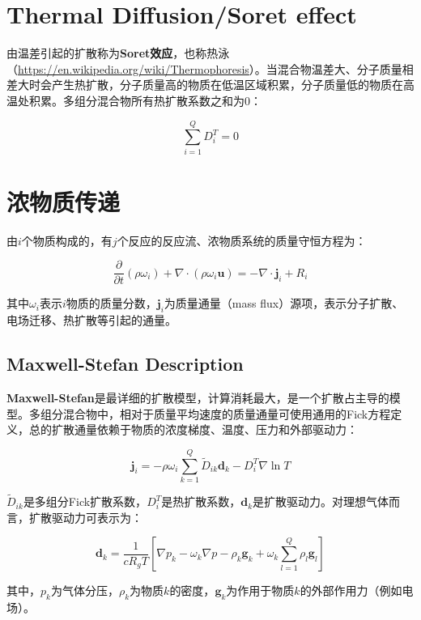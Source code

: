 \section{Thermal Diffusion/Soret effect}

由温差引起的扩散称为\textbf{Soret效应}，也称热泳（\url{https://en.wikipedia.org/wiki/Thermophoresis}）。当混合物温差大、分子质量相差大时会产生热扩散，分子质量高的物质在低温区域积累，分子质量低的物质在高温处积累。多组分混合物所有热扩散系数之和为0：

\begin{equation}
\sum_{i=1}^Q D_i^T = 0
\end{equation}

\section{浓物质传递}
由$i$个物质构成的，有$j$个反应的反应流、浓物质系统的质量守恒方程为：

\begin{equation}
    \frac{\partial}{\partial t}(\rho\omega_i) + \nabla\cdot(\rho\omega_i\bm{u}) = -\nabla\cdot\bm{j}_i + R_i
\end{equation}

其中$\omega_i$表示$i$物质的质量分数，$\bm{j}_i$为质量通量（mass flux）源项，表示分子扩散、电场迁移、热扩散等引起的通量。

\subsection{Maxwell-Stefan Description}
\textbf{Maxwell-Stefan}是最详细的扩散模型，计算消耗最大，是一个扩散占主导的模型。多组分混合物中，相对于质量平均速度的质量通量可使用通用的Fick方程定义，总的扩散通量依赖于物质的浓度梯度、温度、压力和外部驱动力：

\begin{equation}
    \bm{j}_i = -\rho\omega_i\sum_{k=1}^{Q} \tilde{D}_{ik} \bm{d}_{k} - D_i^T\nabla\ln T
\end{equation}

$\tilde{D}_{ik}$是多组分Fick扩散系数，$D_i^T$是热扩散系数，$\bm{d}_k$是扩散驱动力。对理想气体而言，扩散驱动力可表示为：

\begin{equation}
    \bm{d}_k = \frac{1}{cR_gT} \left[ \nabla p_k-\omega_k\nabla p - \rho_k \bm{g}_k +\omega_k \sum_{l=1}^{Q} \rho_l \bm{g}_l \right]
\end{equation}

其中，$p_k$为气体分压，$\rho_k$为物质$k$的密度，$\bm{g}_k$为作用于物质$k$的外部作用力（例如电场）。

